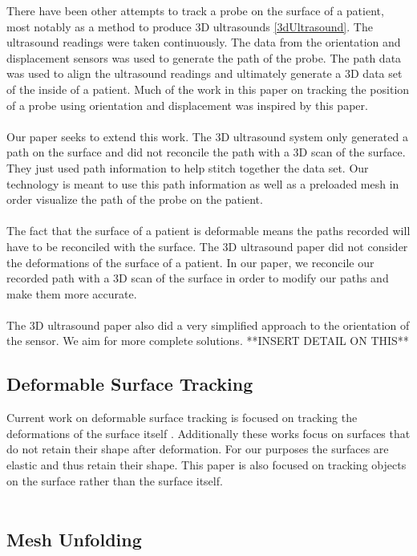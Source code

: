 There have been other attempts to track a probe on the surface of a patient, most notably as a method to produce 3D ultrasounds \ref{3dUltrasound}. The ultrasound readings were taken continuously. The data from the orientation and displacement sensors was used to generate the path of the probe. The path data was used to align the ultrasound readings and ultimately generate a 3D data set of the inside of a patient. Much of the work in this paper on tracking the position of a probe using orientation and displacement was inspired by this paper. \\
\\
Our paper seeks to extend this work. The 3D ultrasound system only generated a path on the surface and did not reconcile the path with a 3D scan of the surface. They just used path information to help stitch together the data set. Our technology is meant to use this path information as well as a preloaded mesh in order visualize the path of the probe on the patient. \\
\\
The fact that the surface of a patient is deformable means the paths recorded will have to be reconciled with the surface. The 3D ultrasound paper did not consider the deformations of the surface of a patient. In our paper, we reconcile our recorded path with a 3D scan of the surface in order to modify our paths and make them more accurate. \\
\\
The 3D ultrasound paper also did a very simplified approach to the orientation of the sensor. We aim for more complete solutions. **INSERT DETAIL ON THIS** 

\subsection{Deformable Surface Tracking}

Current work on deformable surface tracking is focused on tracking the deformations of the surface itself \cite{deformableobjecttracking,convexopt}. Additionally these works focus on surfaces that do not retain their shape after deformation. For our purposes the surfaces are elastic and thus retain their shape. This paper is also focused on tracking objects on the surface rather than the surface itself.\\
\\

\subsection{Mesh Unfolding}


